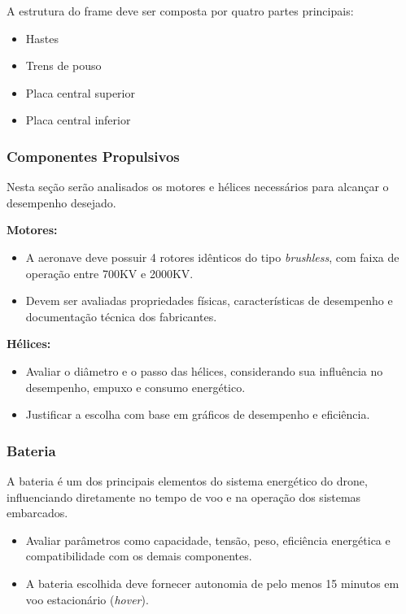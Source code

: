 A estrutura do frame deve ser composta por quatro partes principais:
\begin{itemize}
    \item Hastes
    \item Trens de pouso
    \item Placa central superior
    \item Placa central inferior
\end{itemize}

\subsubsection*{Componentes Propulsivos}

Nesta seção serão analisados os motores e hélices necessários para alcançar o desempenho desejado.

\textbf{Motores:}  
\begin{itemize}
    \item A aeronave deve possuir 4 rotores idênticos do tipo \textit{brushless}, com faixa de operação entre 700KV e 2000KV.
    \item Devem ser avaliadas propriedades físicas, características de desempenho e documentação técnica dos fabricantes.
\end{itemize}

\textbf{Hélices:}  
\begin{itemize}
    \item Avaliar o diâmetro e o passo das hélices, considerando sua influência no desempenho, empuxo e consumo energético.
    \item Justificar a escolha com base em gráficos de desempenho e eficiência.
\end{itemize}

\subsubsection*{Bateria}

A bateria é um dos principais elementos do sistema energético do drone, influenciando diretamente no tempo de voo e na operação dos sistemas embarcados.

\begin{itemize}
    \item Avaliar parâmetros como capacidade, tensão, peso, eficiência energética e compatibilidade com os demais componentes.
    \item A bateria escolhida deve fornecer autonomia de pelo menos 15 minutos em voo estacionário (\textit{hover}).
\end{itemize}


